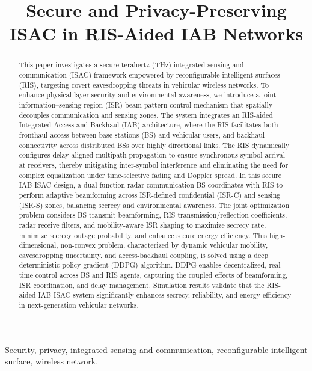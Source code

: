 \documentclass[journal]{IEEEtran}
\begin{document}
\title{Secure and Privacy-Preserving ISAC in RIS-Aided IAB Networks}

\maketitle

\begin{abstract}
 This paper investigates a secure terahertz (THz) integrated sensing and communication (ISAC) framework empowered by reconfigurable intelligent surfaces (RIS), targeting covert eavesdropping threats in vehicular wireless networks. To enhance physical-layer security and environmental awareness, we introduce a joint information–sensing region (ISR) beam pattern control mechanism that spatially decouples communication and sensing zones. The system integrates an RIS-aided Integrated Access and Backhaul (IAB) architecture, where the RIS facilitates both fronthaul access between base stations (BS) and vehicular users, and backhaul connectivity across distributed BSs over highly directional links. The RIS dynamically configures delay-aligned multipath propagation to ensure synchronous symbol arrival at receivers, thereby mitigating inter-symbol interference and eliminating the need for complex equalization under time-selective fading and Doppler spread. In this secure IAB-ISAC design, a dual-function radar-communication BS coordinates with RIS to perform adaptive beamforming across ISR-defined confidential (ISR-C) and sensing (ISR-S) zones, balancing secrecy and environmental awareness. The joint optimization problem considers BS transmit beamforming, RIS transmission/reflection coefficients, radar receive filters, and mobility-aware ISR shaping to maximize secrecy rate, minimize secrecy outage probability, and enhance secure energy efficiency. This high-dimensional, non-convex problem, characterized by dynamic vehicular mobility, eavesdropping uncertainty, and access-backhaul coupling, is solved using a deep deterministic policy gradient (DDPG) algorithm. DDPG enables decentralized, real-time control across BS and RIS agents, capturing the coupled effects of beamforming, ISR coordination, and delay management. Simulation results validate that the RIS-aided IAB-ISAC system significantly enhances secrecy, reliability, and energy efficiency in next-generation vehicular networks.
\end{abstract}

\begin{IEEEkeywords}
Security, privacy, integrated sensing and communication, reconfigurable intelligent surface, wireless network.
\end{IEEEkeywords}
\end{document}
